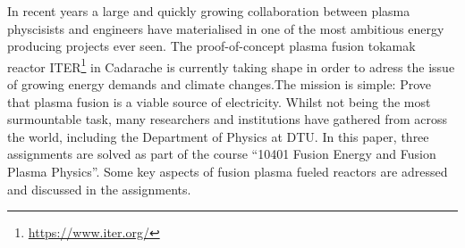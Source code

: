 In recent years a large and quickly growing collaboration between plasma physcisists and engineers have materialised in one of the most ambitious energy producing projects ever seen. The proof-of-concept plasma fusion tokamak reactor ITER\footnote{\url{https://www.iter.org/}} in Cadarache is currently taking shape in order to adress the issue of growing energy demands and climate changes.\newline The mission is simple: Prove that plasma fusion is a viable source of electricity.\newline
Whilst not being the most surmountable task, many researchers and institutions have gathered from across the world, including the Department of Physics at DTU.\newline
In this paper, three assignments are solved as part of the course ``10401 Fusion Energy and Fusion Plasma Physics''. Some key aspects of fusion plasma fueled reactors are adressed and discussed in the assignments.
